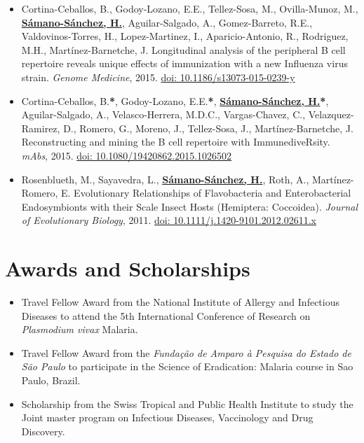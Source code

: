 \documentclass[11pt,a4paper,sans]{moderncv} %
\begin{document}
\begin{itemize}
  \item Cortina-Ceballos, B., Godoy-Lozano, E.E., Tellez-Sosa, M., Ovilla-Munoz, M., \textbf{\underline{S\'amano-S\'anchez, H.}}, Aguilar-Salgado, A., Gomez-Barreto, R.E., Valdovinos-Torres, H., Lopez-Martinez, I., Aparicio-Antonio, R., Rodriguez, M.H., Mart\'inez-Barnetche, J. Longitudinal analysis of the peripheral B cell repertoire reveals unique effects of immunization with a new Influenza virus strain. \textit{Genome Medicine}, 2015. \href{https://doi.org/10.1186/s13073-015-0239-y}{doi: 10.1186/s13073-015-0239-y}
  \item Cortina-Ceballos, B.\textbf{*}, Godoy-Lozano, E.E.\textbf{*}, \textbf{\underline{S\'amano-S\'anchez, H.}}\textbf{*}, Aguilar-Salgado, A., Velasco-Herrera, M.D.C., Vargas-Chavez, C., Velazquez-Ramirez, D., Romero, G., Moreno, J., Tellez-Sosa, J., Mart\'inez-Barnetche, J. Reconstructing and mining the B cell repertoire with ImmunediveRsity. \textit{mAbs}, 2015. \href{https://doi.org/10.1080/19420862.2015.1026502}{doi: 10.1080/19420862.2015.1026502}
  \item Rosenblueth, M., Sayavedra, L., \textbf{\underline{S\'amano-S\'anchez, H.}}, Roth, A., Mart\'inez-Romero, E. Evolutionary Relationships of Flavobacteria and Enterobacterial Endosymbionts with their Scale Insect Hosts (Hemiptera: Coccoidea). \textit{Journal of Evolutionary Biology}, 2011. \href{https://doi.org/10.1111/j.1420-9101.2012.02611.x}{doi: 10.1111/j.1420-9101.2012.02611.x}\\
\end{itemize}

\section{Awards and Scholarships}
\begin{itemize}
  \item Travel Fellow Award from the National Institute of Allergy and Infectious Diseases to attend the 5th International Conference of Research on \textit{Plasmodium vivax} Malaria.
  \item Travel Fellow Award from the \textit{Funda\c c\~ao de Amparo \`a Pesquisa do Estado de S\~ao Paulo} to participate in the Science of Eradication: Malaria course in Sao Paulo, Brazil.
  \item Scholarship from the Swiss Tropical and Public Health Institute to study the Joint master program on Infectious Diseases, Vaccinology and Drug Discovery.\\
\end{itemize}
\end{document}
